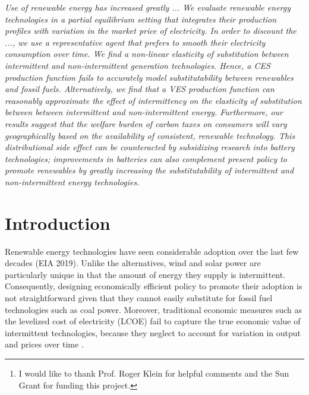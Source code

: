 \documentclass[11pt,a4paper]{extarticle}
\begin{document}
\title{}

\author[]{Saketh Aleti\thanks{I would like to thank Prof. Roger Klein for helpful comments and the Sun Grant for funding this project.} \, and Gal Hochman}


\date{\vspace{-1em}\today}

\maketitle

\begin{addmargin}[0.5in]{0.5in}
	\textit{ Use of renewable energy has increased greatly ... 
		We evaluate renewable energy technologies in a partial equilibrium setting that integrates their production profiles with variation in the market price of electricity. 
		In order to discount the ..., we use a representative agent that prefers to smooth their electricity consumption over time. 
		We find a non-linear elasticity of substitution between intermittent and non-intermittent generation technologies. Hence, a CES production function fails to accurately model substitutability between renewables and fossil fuels. Alternatively, we find that a VES production function can reasonably approximate the effect of intermittency on the elasticity of substitution between between intermittent and non-intermittent energy. 
		Furthermore, our results suggest that the welfare burden of carbon taxes on consumers will vary geographically based on the availability of consistent, renewable technology. This distributional side effect can be counteracted by subsidizing research into battery technologies; improvements in batteries can also complement present policy to promote renewables by greatly increasing the substitutability of intermittent  and non-intermittent energy technologies. 
	 }
\end{addmargin}


\section{Introduction}

Renewable energy technologies have seen considerable adoption over the last few decades (EIA 2019). Unlike the alternatives, wind and solar power are particularly unique in that the amount of energy they supply is intermittent. Consequently, designing economically efficient policy to promote their adoption is not straightforward given that they cannot easily substitute for fossil fuel technologies such as coal power. Moreover, traditional economic measures such as the levelized cost of electricity (LCOE) fail to capture the true economic value of intermittent technologies, because they neglect to account for variation in output and prices over time \citep{Joskow2011}.  
\end{document}

